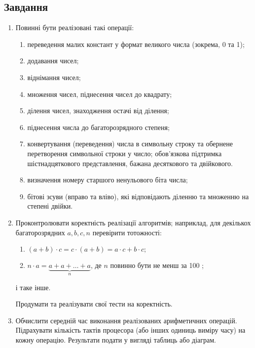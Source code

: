 \documentclass{article}
\begin{document}
\subsection{Завдання}
\begin{enumerate}
    
\item Повинні бути реалізовані такі операції:

\begin{enumerate}
  \item переведення малих констант у формат великого числа (зокрема, 0 та 1);

  \item додавання чисел;

  \item віднімання чисел;

  \item множення чисел, піднесення чисел до квадрату;

  \item ділення чисел, знаходження остачі від ділення;

  \item піднесення числа до багаторозрядного степеня;

  \item конвертування (переведення) числа в символьну строку та обернене перетворення символьної строки у число; обов'язкова підтримка шістнадцяткового представлення, бажана десяткового та двійкового.

  \item визначення номеру старшого ненульового біта числа;

  \item бітові зсуви (вправо та вліво), які відповідають діленню та множенню на степені двійки.

\end{enumerate}

    \item Проконтролювати коректність реалізації алгоритмів; наприклад, для декількох багаторозрядних $a, b, c, n$ перевірити тотожності:

\begin{enumerate}
  \item $(a+b) \cdot c=c \cdot(a+b)=a \cdot c+b \cdot c ;$

  \item $n \cdot a=\underbrace{a+a+\ldots+a}_{n}$, де $n$ повинно бути не менш за 100 ;

\end{enumerate}

і таке інше.

Продумати та реалізувати свої тести на коректність.

    \item Обчислити середній час виконання реалізованих арифметичних операцій. Підрахувати кількість тактів процесора (або інших одиниць виміру часу) на кожну операцію. Результати подати у вигляді таблиць або діаграм.

\end{enumerate}
\end{document}
